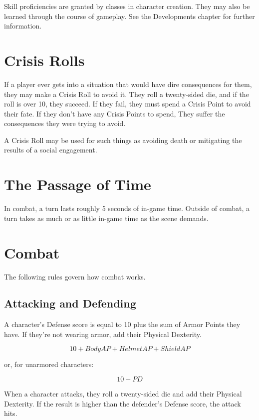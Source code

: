 \begin{multicols}{2}
Skill proficiencies are granted by classes in character creation.
They may also be learned through the course of gameplay. See
the Developments chapter for further information.

\section{Crisis Rolls}

If a player ever gets into a situation that would have dire
consequences for them, they may make a Crisis Roll to avoid it.
They roll a twenty-sided die, and if the roll is over 10, they
succeed. If they fail, they must spend a Crisis Point to avoid
their fate. If they don't have any Crisis Points to spend, They
suffer the consequences they were trying to avoid.

A Crisis Roll may be used for such things as avoiding death or
mitigating the results of a social engagement.

\section{The Passage of Time}

In combat, a turn lasts roughly 5 seconds of in-game time. Outside
of combat, a turn takes as much or as little in-game time as the
scene demands.

\section{Combat}

The following rules govern how combat works.

\subsection{Attacking and Defending}

A character's Defense score is equal to 10 plus the sum of Armor Points they
have. If they're not wearing armor, add their Physical Dexterity.

$$10 + Body AP + Helmet AP + Shield AP$$

or, for unarmored characters:

$$10 + PD$$

When a character attacks, they roll a twenty-sided die and add their Physical
Dexterity. If the result is higher than the defender's Defense score, the attack hits.


\end{multicols}
